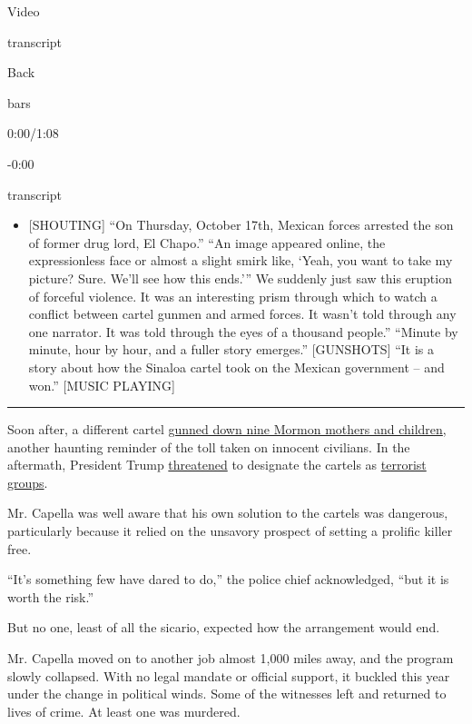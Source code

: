 Video

transcript

Back

bars

0:00/1:08

-0:00

transcript

\begin{itemize}
\tightlist
\item
  {[}SHOUTING{]} ``On Thursday, October 17th, Mexican forces arrested
  the son of former drug lord, El Chapo.'' ``An image appeared online,
  the expressionless face or almost a slight smirk like, `Yeah, you want
  to take my picture? Sure. We'll see how this ends.''' We suddenly just
  saw this eruption of forceful violence. It was an interesting prism
  through which to watch a conflict between cartel gunmen and armed
  forces. It wasn't told through any one narrator. It was told through
  the eyes of a thousand people.'' ``Minute by minute, hour by hour, and
  a fuller story emerges.'' {[}GUNSHOTS{]} ``It is a story about how the
  Sinaloa cartel took on the Mexican government -- and won.'' {[}MUSIC
  PLAYING{]}
\end{itemize}

\begin{center}\rule{0.5\linewidth}{\linethickness}\end{center}

Soon after, a different cartel
\href{https://www.nytimes.com/2019/11/07/world/americas/mexico-mormon-massacre.html?action=click\&module=News\&pgtype=Homepage}{gunned
down nine Mormon mothers and children}, another haunting reminder of the
toll taken on innocent civilians. In the aftermath, President Trump
\href{https://www.nytimes.com/2019/12/06/us/trump-drug-cartels-terrorists.html}{threatened}
to designate the cartels as
\href{https://www.nytimes.com/2019/11/27/world/mexico-trump-terrorist-cartel.html}{terrorist
groups}.

Mr. Capella was well aware that his own solution to the cartels was
dangerous, particularly because it relied on the unsavory prospect of
setting a prolific killer free.

``It's something few have dared to do,'' the police chief acknowledged,
``but it is worth the risk.''

But no one, least of all the sicario, expected how the arrangement would
end.

Mr. Capella moved on to another job almost 1,000 miles away, and the
program slowly collapsed. With no legal mandate or official support, it
buckled this year under the change in political winds. Some of the
witnesses left and returned to lives of crime. At least one was
murdered.

